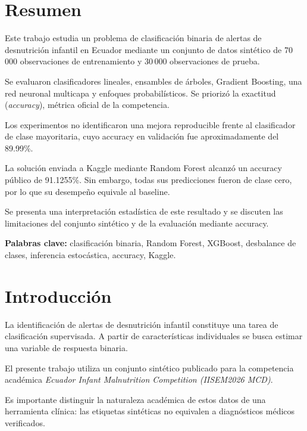 ﻿\documentclass[11pt,a4paper]{article}
\begin{document}

\section*{Resumen}

Este trabajo estudia un problema de clasificación binaria
de alertas de desnutrición infantil en Ecuador mediante un
conjunto de datos sintético de 70\,000 observaciones de
entrenamiento y 30\,000 observaciones de prueba.

Se evaluaron clasificadores lineales, ensambles de árboles,
Gradient Boosting, una red neuronal multicapa y enfoques
probabilísticos. Se priorizó la exactitud
(\emph{accuracy}), métrica oficial de la competencia.

Los experimentos no identificaron una mejora reproducible
frente al clasificador de clase mayoritaria, cuyo accuracy
en validación fue aproximadamente del 89.99\%.

La solución enviada a Kaggle mediante Random Forest
alcanzó un accuracy público de 91.1255\%.
Sin embargo, todas sus predicciones fueron de clase cero,
por lo que su desempeño equivale al baseline.

Se presenta una interpretación estadística de este
resultado y se discuten las limitaciones del conjunto
sintético y de la evaluación mediante accuracy.

\noindent\textbf{Palabras clave:}
clasificación binaria, Random Forest, XGBoost,
desbalance de clases, inferencia estocástica,
accuracy, Kaggle.

\tableofcontents
\newpage

\section{Introducción}

La identificación de alertas de desnutrición infantil
constituye una tarea de clasificación supervisada.
A partir de características individuales se busca
estimar una variable de respuesta binaria.

El presente trabajo utiliza un conjunto sintético
publicado para la competencia académica
\emph{Ecuador Infant Malnutrition Competition
(IISEM2026 MCD)}.

Es importante distinguir la naturaleza académica de
estos datos de una herramienta clínica:
las etiquetas sintéticas no equivalen a diagnósticos
médicos verificados.
\end{document}
